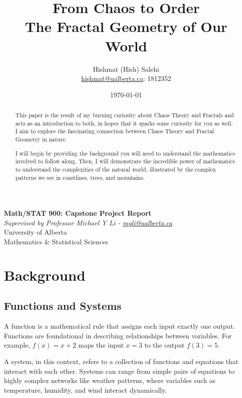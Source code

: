 \documentclass[12pt]{article}
\title{From Chaos to Order\\
       \large The Fractal Geometry of Our World}
\author{Hishmat (Hish) Salehi \\
\href{mailto:hishmat@ualberta.ca}{hishmat@ualberta.ca}: 1812352}
\date{\today}
\begin{document}
\maketitle

\begin{center}
\textbf{Math/STAT 900: Capstone Project Report}  \\
\emph{Supervised by Professor Michael Y Li - 
\href{mailto:myli@ualberta.ca}{myli@ualberta.ca}}  \\
University of Alberta \\
Mathematics \& Statistical Sciences
\end{center}

\begin{abstract}
This paper is the result of my burning curiosity about Chaos Theory and Fractals and acts as an introduction to both, in hopes that it sparks some curiosity for you as well. I aim to explore the fascinating connection between Chaos Theory and Fractal Geometry in nature. 

I will begin by providing the background you will need to understand the mathematics involved to follow along. Then, I will demonstrate the incredible power of mathematics to understand the complexities of the natural world, illustrated by the complex patterns we see in coastlines, trees, and mountains. 
\end{abstract}

\newpage

\tableofcontents

\section{Background}


\subsection{Functions and Systems}
A function is a mathematical rule that assigns each input exactly one output. Functions are foundational in describing relationships between variables. For example, \( f(x) = x + 2 \) maps the input \( x = 3 \) to the output \( f(3) = 5 \).

A system, in this context, refers to a collection of functions and equations that interact with each other. Systems can range from simple pairs of equations to highly complex networks like weather patterns, where variables such as temperature, humidity, and wind interact dynamically.
\end{document}
